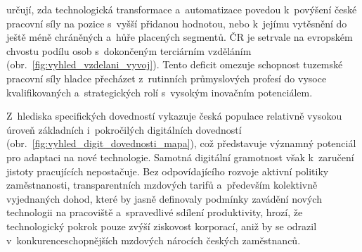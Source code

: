  určují, zda technologická transformace a~automatizace povedou k~povýšení české pracovní síly na pozice s~vyšší přidanou hodnotou, nebo k~jejímu vytěsnění do ještě méně chráněných a~hůře placených segmentů. \Ac{ČR} je setrvale na evropském chvostu podílu osob s~dokončeným terciárním vzděláním (obr.~\ref{fig:vyhled_vzdelani_vyvoj}). Tento deficit omezuje schopnost tuzemské pracovní síly hladce přecházet z~rutinních průmyslových profesí do vysoce kvalifikovaných a~strategických rolí s~vysokým inovačním potenciálem.\par



Z~hlediska specifických dovedností vykazuje česká populace relativně vysokou úroveň základních i~pokročilých digitálních dovedností (obr.~\ref{fig:vyhled_digit_dovednosti_mapa}), což představuje významný potenciál pro adaptaci na nové technologie. Samotná digitální gramotnost však k~zaručení jistoty pracujících nepostačuje. Bez odpovídajícího rozvoje aktivní politiky zaměstnanosti, transparentních mzdových tarifů a~především kolektivně vyjednaných dohod, které by jasně definovaly podmínky zavádění nových technologii na pracoviště a~spravedlivé sdílení produktivity, hrozí, že technologický pokrok pouze zvýší ziskovost korporací, aniž by se odrazil v~konkurenceschopnějších mzdových nárocích českých zaměstnanců.\par


